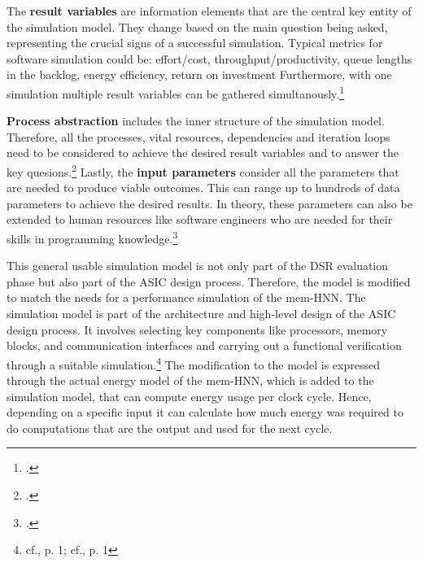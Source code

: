 The \textbf{result variables} are information elements that are the central key entity of the simulation model. 
They change based on the main question being asked, representing the crucial signs of a successful simulation.
Typical metrics for software simulation could be: effort/cost, throughput/productivity, queue lengths in the backlog,
energy efficiency, return on investment
Furthermore, with one simulation multiple result variables can be gathered simultanously.\footcite[cf.][96-97]{kellnerSoftwareProcessSimulation1999}

\textbf{Process abstraction} includes the inner structure of the simulation model.
Therefore, all the processes, vital resources, dependencies and iteration loops need to be considered to achieve the desired result variables and to answer the key quesions.\footcite[cf.][97]{kellnerSoftwareProcessSimulation1999}
Lastly, the \textbf{input parameters} consider all the parameters that are needed to produce viable outcomes. 
This can range up to hundreds of data parameters to achieve the desired results. 
In theory, these parameters can also be extended to human resources like software engineers who are needed for their skills in programming knowledge.\footcite[cf.][97-98]{kellnerSoftwareProcessSimulation1999}

This general usable simulation model is not only part of the \ac{DSR} evaluation phase but also part of the \ac{ASIC} design process. 
Therefore, the model is modified to match the needs for a performance simulation of the \ac{mem-HNN}.
The simulation model is part of the architecture and high-level design of the \ac{ASIC} design process.
It involves selecting key components like processors, memory blocks, and communication interfaces and carrying out a functional verification through a suitable simulation.\footnote{cf.\cite{raoUltimateGuideASIC}, p. 1; cf.\cite{ASICDesignFlow}, p. 1}
The modification to the model is expressed through the actual energy model of the \ac{mem-HNN}, which is added to the simulation model, that can compute energy usage per clock cycle. 
Hence, depending on a specific input it can calculate how much energy was required to do computations that are the output and used for the next cycle. 
